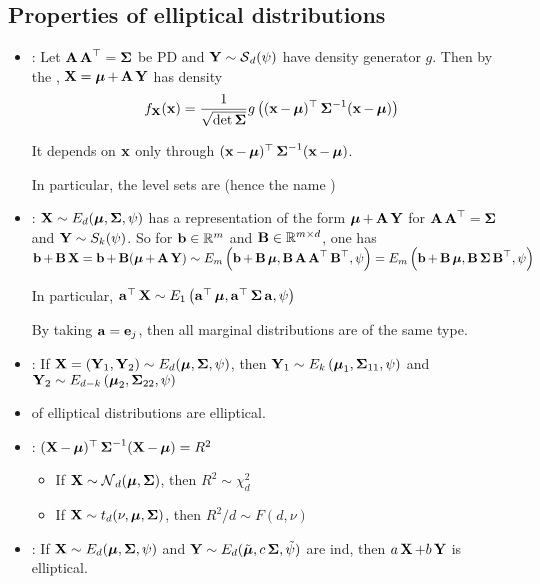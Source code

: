 \subsection*{Properties of elliptical distributions}
\begin{itemize}[leftmargin=*]
    \item {}:
Let $\A \A^{\T}=\mSigma$ be PD and $\Y \sim \S_{d}(\psi)$ have density generator $g$. Then by the , $\X=\mmu+\A \Y$ has density
$$
f_{\X}(\x)=\frac{1}{\sqrt{\operatorname{det} \mSigma}} g\left((\x-\mmu)^{\T} \mSigma^{-1}(\x-\mmu)\right)
$$

It depends on $\x$ only through $(\x-\mmu)^{\T} \mSigma^{-1}(\x-\mmu)$.

In particular, the level sets are  (hence the name )

    \item {}: $\X \sim E_{d}(\mmu, \mSigma, \psi)$ has a representation of the form $\mmu+\A \Y$ for $\A \A^{\T}=\mSigma$ and $\Y \sim S_{k}(\psi)$. So for $\b \in \mathbb{R}^{m}$ and $\B \in \mathbb{R}^{m \times d}$, one has
$
\b+\B \X=\b+\B(\mmu+\A \Y) \sim E_{m}\left(\b+\B \mmu, \B \A \A^{\T} \B^{\T}, \psi\right)=E_{m}\left(\b+\B \mmu, \B \mSigma \B^{\T}, \psi\right)
$

In particular, $\a^{\T} \X \sim E_{1}\left(\a^{\T} \mmu, \a^{\T} \mSigma \a, \psi\right)$

By taking $\a=\vect{e}_{j}$, then all marginal distributions are of the same type.

    \item {}: If $\X=\left(\Y_{1}, \Y_{2}\right) \sim E_{d}(\mmu, \mSigma, \psi)$, then $\Y_{1} \sim E_{k}\left(\mmu_{1}, \mSigma_{11}, \psi\right)$ and $\Y_{2} \sim E_{d-k}\left(\mmu_{2}, \mSigma_{22}, \psi\right)$
    
    
    \item {} of elliptical distributions are elliptical.
    
    \item {}: $(\X-\mmu)^{\T} \mSigma^{-1}(\X-\mmu)=R^{2}$
    \begin{itemize}[leftmargin=*]
        \item If $\X \sim \N_{d}(\mmu, \mSigma)$, then $R^{2} \sim \chi_{d}^{2}$
        \item If $\X \sim t_{d}(\nu, \mmu, \mSigma)$, then $R^{2} / d \sim F(d, \nu)$
    \end{itemize}
    
    \item {}: If $\X \sim E_{d}(\mmu, \mSigma, \psi)$ and $\Y \sim E_{d}(\tilde{\mmu}, c \mSigma, \tilde{\psi})$ are ind, then $a \X+b \Y$ is elliptical.
\end{itemize}






